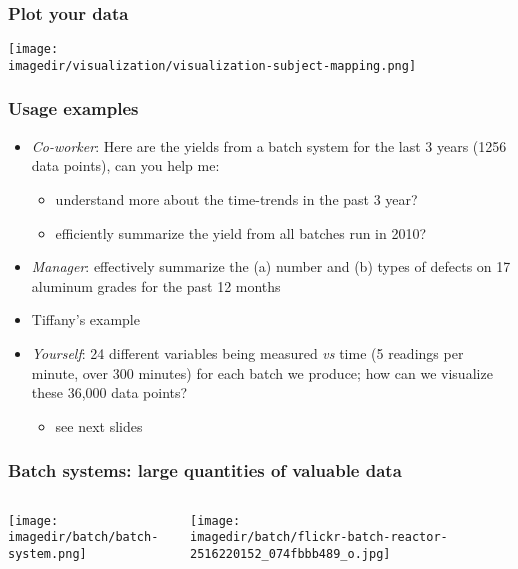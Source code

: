 \begin{frame}\frametitle{Plot your data}
	\begin{center}
		\texttt{[image: \\imagedir/visualization/visualization-subject-mapping.png]}
	\end{center}
\end{frame}

\begin{frame}\frametitle{Usage examples}
	\begin{itemize}
		\item	\emph{Co-worker}: Here are the yields from a batch system for the last 3 years (1256 data points), can you help me: 
		\begin{itemize}
			\item	understand more about the time-trends in the past 3 year? 
			\item	efficiently summarize the yield from all batches run in 2010? \pause 
		\end{itemize}
		\item	\emph{Manager}: effectively summarize the (a) number and (b) types of defects on 17 aluminum grades for the past 12 months \pause 
		\item	Tiffany's example
		\item	\emph{Yourself}: 24 different variables being measured \emph{vs} time (5 readings per minute, over 300 minutes) for each batch we produce; how can we visualize these 36,000 data points? 
		\begin{itemize}
			\item	see next slides
		\end{itemize}
	\end{itemize}
\end{frame}

\begin{frame}\frametitle{Batch systems: large quantities of valuable data}
	\begin{columns}[t]
			\begin{center}
				\texttt{[image: \\imagedir/batch/batch-system.png]}
			\end{center}
			
			\begin{center}
				\texttt{[image: \\imagedir/batch/flickr-batch-reactor-2516220152\_074fbbb489\_o.jpg]}
			\end{center}
	\end{columns}
\end{frame}

